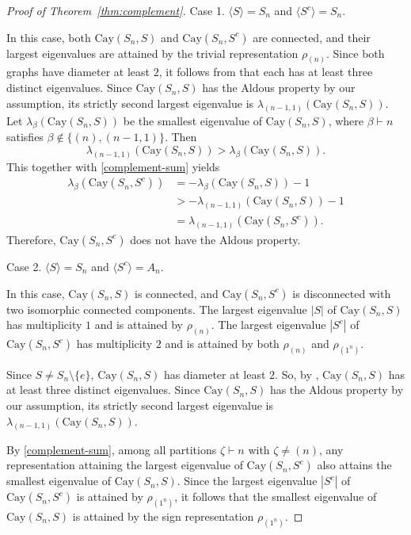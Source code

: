 \documentclass[12pt, a4paper]{article}
\theoremstyle{definition}
\begin{document}
\begin{proof}[Proof of Theorem~\ref{thm:complement}]
\smallskip
\textsf{Case 1.} $\langle S\rangle=S_n$ and $\langle S^c\rangle=S_n$.
\smallskip

In this case, both $\mathrm{Cay}(S_n,S)$ and $\mathrm{Cay}(S_n,S^c)$ are connected, and their largest eigenvalues are attained by the trivial representation $\rho_{(n)}$. Since both graphs have diameter at least $2$, it follows from \cite[Lemma 8.12.1]{GR2001} that each has at least three distinct eigenvalues. Since $\mathrm{Cay}(S_n,S)$ has the Aldous property by our assumption, its strictly second largest eigenvalue is
$\lambda_{(n-1,1)}(\mathrm{Cay}(S_n,S))$. Let $\lambda_{\beta}(\mathrm{Cay}(S_n,S))$ be the smallest eigenvalue of $\mathrm{Cay}(S_n,S)$, where $\beta\vdash n$ satisfies $\beta\notin\{(n),(n-1,1)\}$. Then
$$
\lambda_{(n-1,1)}(\mathrm{Cay}(S_n,S)) > \lambda_{\beta}(\mathrm{Cay}(S_n,S)).
$$
This together with \eqref{complement-sum} yields
\begin{align*}
\lambda_{\beta}(\mathrm{Cay}(S_n,S^c))
&=-\lambda_{\beta}(\mathrm{Cay}(S_n,S))-1 \\
&> -\lambda_{(n-1,1)}(\mathrm{Cay}(S_n,S))-1 \\
&= \lambda_{(n-1,1)}(\mathrm{Cay}(S_n,S^c)).
\end{align*}
Therefore, $\mathrm{Cay}(S_n,S^c)$ does not have the Aldous property.

\smallskip
\textsf{Case 2.} $\langle S\rangle=S_n$ and $\langle S^c\rangle=A_n$.
\smallskip

In this case, $\mathrm{Cay}(S_n,S)$ is connected, and $\mathrm{Cay}(S_n,S^c)$ is disconnected with two isomorphic connected components. The largest eigenvalue $|S|$ of $\mathrm{Cay}(S_n,S)$ has multiplicity $1$ and is attained by $\rho_{(n)}$. The largest eigenvalue $|S^c|$ of $\mathrm{Cay}(S_n,S^c)$ has multiplicity $2$ and is attained by both $\rho_{(n)}$ and $\rho_{(1^n)}$.

Since $S\neq S_n\setminus\{e\}$,  $\mathrm{Cay}(S_n,S)$ has diameter at least $2$. So, by \cite[Lemma 8.12.1]{GR2001}, $\mathrm{Cay}(S_n,S)$ has at least three distinct eigenvalues. Since $\mathrm{Cay}(S_n,S)$ has the Aldous property by our assumption, its strictly second largest eigenvalue is $\lambda_{(n-1,1)}(\mathrm{Cay}(S_n,S)).$

By \eqref{complement-sum}, among all partitions $\zeta\vdash n$ with $\zeta\ne (n)$, any representation attaining the largest eigenvalue of $\mathrm{Cay}(S_n,S^c)$ also attains the smallest eigenvalue of $\mathrm{Cay}(S_n,S)$. Since the largest eigenvalue $|S^c|$ of $\mathrm{Cay}(S_n,S^c)$ is attained by $\rho_{(1^n)}$, it follows that the smallest eigenvalue of $\mathrm{Cay}(S_n,S)$ is attained by the sign representation $\rho_{(1^n)}$.


\end{proof}
\end{document}
